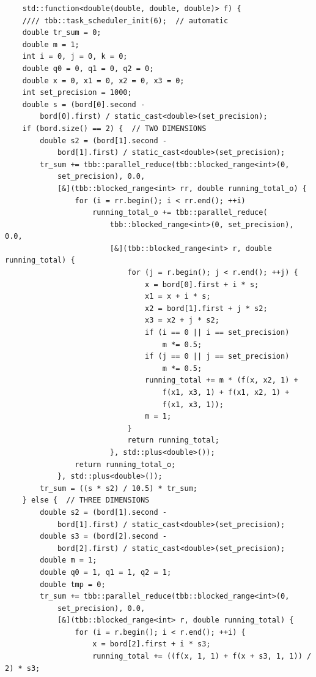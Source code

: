 \documentclass{report}
\begin{document}
\begin{verbatim}
    std::function<double(double, double, double)> f) {
    //// tbb::task_scheduler_init(6);  // automatic
    double tr_sum = 0;
    double m = 1;
    int i = 0, j = 0, k = 0;
    double q0 = 0, q1 = 0, q2 = 0;
    double x = 0, x1 = 0, x2 = 0, x3 = 0;
    int set_precision = 1000;
    double s = (bord[0].second -
        bord[0].first) / static_cast<double>(set_precision);
    if (bord.size() == 2) {  // TWO DIMENSIONS
        double s2 = (bord[1].second -
            bord[1].first) / static_cast<double>(set_precision);
        tr_sum += tbb::parallel_reduce(tbb::blocked_range<int>(0,
            set_precision), 0.0,
            [&](tbb::blocked_range<int> rr, double running_total_o) {
                for (i = rr.begin(); i < rr.end(); ++i)
                    running_total_o += tbb::parallel_reduce(
                        tbb::blocked_range<int>(0, set_precision), 0.0,
                        [&](tbb::blocked_range<int> r, double running_total) {
                            for (j = r.begin(); j < r.end(); ++j) {
                                x = bord[0].first + i * s;
                                x1 = x + i * s;
                                x2 = bord[1].first + j * s2;
                                x3 = x2 + j * s2;
                                if (i == 0 || i == set_precision)
                                    m *= 0.5;
                                if (j == 0 || j == set_precision)
                                    m *= 0.5;
                                running_total += m * (f(x, x2, 1) +
                                    f(x1, x3, 1) + f(x1, x2, 1) +
                                    f(x1, x3, 1));
                                m = 1;
                            }
                            return running_total;
                        }, std::plus<double>());
                return running_total_o;
            }, std::plus<double>());
        tr_sum = ((s * s2) / 10.5) * tr_sum;
    } else {  // THREE DIMENSIONS
        double s2 = (bord[1].second -
            bord[1].first) / static_cast<double>(set_precision);
        double s3 = (bord[2].second -
            bord[2].first) / static_cast<double>(set_precision);
        double m = 1;
        double q0 = 1, q1 = 1, q2 = 1;
        double tmp = 0;
        tr_sum += tbb::parallel_reduce(tbb::blocked_range<int>(0,
            set_precision), 0.0,
            [&](tbb::blocked_range<int> r, double running_total) {
                for (i = r.begin(); i < r.end(); ++i) {
                    x = bord[2].first + i * s3;
                    running_total += ((f(x, 1, 1) + f(x + s3, 1, 1)) / 2) * s3;

\end{verbatim}
\end{document}
